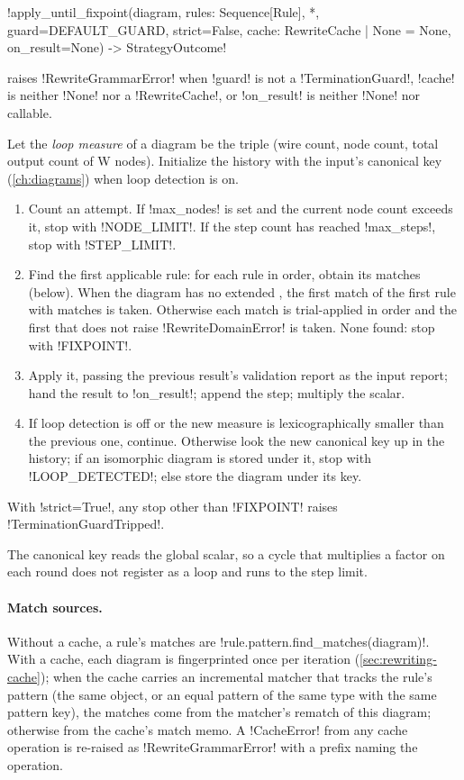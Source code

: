\begin{signature}
\py!apply_until_fixpoint(diagram, rules: Sequence[Rule], *, guard=DEFAULT_GUARD, strict=False, cache: RewriteCache | None = None, on_result=None) -> StrategyOutcome!
\end{signature}
raises \py!RewriteGrammarError! when \py!guard! is not a \py!TerminationGuard!, \py!cache! is
neither \py!None! nor a \py!RewriteCache!, or \py!on_result! is neither \py!None! nor callable.
\begin{algorithm}\label{alg:rewriting-fixpoint}
Let the \emph{loop measure} of a diagram be the triple (wire count, node count, total output count
of W nodes). Initialize the history with the input's canonical key (\cref{ch:diagrams}) when loop
detection is on.
\begin{enumerate}
\item Count an attempt. If \py!max_nodes! is set and the current node count exceeds it, stop with
  \code!NODE_LIMIT!. If the step count has reached \py!max_steps!, stop with \code!STEP_LIMIT!.
\item Find the first applicable rule: for each rule in order, obtain its matches (below). When the
  diagram has no extended \bbox{}, the first match of the first rule with matches is taken.
  Otherwise each match is trial-applied in order and the first that does not raise
  \py!RewriteDomainError! is taken. None found: stop with \code!FIXPOINT!.
\item Apply it, passing the previous result's validation report as the input report; hand the
  result to \py!on_result!; append the step; multiply the scalar.
\item If loop detection is off or the new measure is lexicographically smaller than the previous
  one, continue. Otherwise look the new canonical key up in the history; if an isomorphic diagram is
  stored under it, stop with \code!LOOP_DETECTED!; else store the diagram under its key.
\end{enumerate}
With \py!strict=True!, any stop other than \code!FIXPOINT! raises \py!TerminationGuardTripped!.
\end{algorithm}
The canonical key reads the global scalar, so a cycle that multiplies a factor on each round does
not register as a loop and runs to the step limit.

\paragraph{Match sources.}
Without a cache, a rule's matches are \py!rule.pattern.find_matches(diagram)!. With a cache, each
diagram is fingerprinted once per iteration (\cref{sec:rewriting-cache}); when the cache carries an
incremental matcher that tracks the rule's pattern (the same object, or an equal pattern of the same
type with the same pattern key), the matches come from the matcher's rematch of this diagram;
otherwise from the cache's match memo. A \py!CacheError! from any cache operation is re-raised as
\py!RewriteGrammarError! with a prefix naming the operation.

